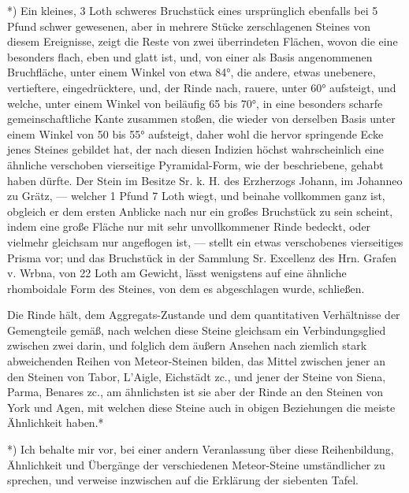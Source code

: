 \documentclass[a4paper, 11pt, oneside, german]{article}
\begin{document}
*) Ein kleines, 3 Loth schweres Bruchstück eines ursprünglich ebenfalls bei 5 Pfund schwer gewesenen, aber in mehrere Stücke zerschlagenen Steines von diesem Ereignisse, zeigt die Reste von zwei überrindeten Flächen, wovon die eine besonders flach, eben und glatt ist, und, von einer als Basis angenommenen Bruchfläche, unter einem Winkel von etwa 84°, die andere, etwas unebenere, vertieftere, eingedrücktere, und, der Rinde nach, rauere, unter 60° aufsteigt, und welche, unter einem Winkel von beiläufig 65 bis 70°, in eine besonders scharfe gemeinschaftliche Kante zusammen stoßen, die wieder von derselben Basis unter einem Winkel von 50 bis 55° aufsteigt, daher wohl die hervor springende Ecke jenes Steines gebildet hat, der nach diesen Indizien höchst wahrscheinlich eine ähnliche verschoben vierseitige Pyramidal-Form, wie der beschriebene, gehabt haben dürfte.  
Der Stein im Besitze Sr. k. H. des Erzherzogs Johann, im Johanneo zu Grätz, --- welcher 1 Pfund 7 Loth wiegt, und beinahe vollkommen ganz ist, obgleich er dem ersten Anblicke nach nur ein großes Bruchstück zu sein scheint, indem eine große Fläche nur mit sehr unvollkommener Rinde bedeckt, oder vielmehr gleichsam nur angeflogen ist, --- stellt ein etwas verschobenes vierseitiges Prisma vor; und das Bruchstück in der Sammlung Sr. Excellenz des Hrn. Grafen v. Wrbna, von 22 Loth am Gewicht, lässt wenigstens auf eine ähnliche rhomboidale Form des Steines, von dem es abgeschlagen wurde, schließen.

Die Rinde hält, dem Aggregats-Zustande und dem quantitativen Verhältnisse der Gemengteile gemäß, nach welchen diese Steine gleichsam ein Verbindungsglied zwischen zwei darin, und folglich dem äußern Ansehen nach ziemlich stark abweichenden Reihen von Meteor-Steinen bilden, das Mittel zwischen jener an den Steinen von Tabor, L'Aigle, Eichstädt zc., und jener der Steine von Siena, Parma, Benares zc., am ähnlichsten ist sie aber der Rinde an den Steinen von York und Agen, mit welchen diese Steine auch in obigen Beziehungen die meiste Ähnlichkeit haben.*

*) Ich behalte mir vor, bei einer andern Veranlassung über diese Reihenbildung, Ähnlichkeit und Übergänge der verschiedenen Meteor-Steine umständlicher zu sprechen, und verweise inzwischen auf die Erklärung der siebenten Tafel.
\end{document}
